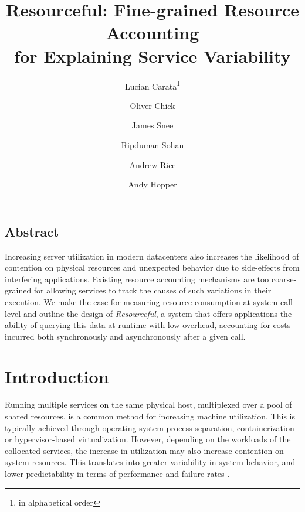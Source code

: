 \documentclass[letterpaper,twocolumn,10pt]{article}
\newcommand{\pname}{Resourceful}
\newcommand*\aorder[1][\value{footnote}]{\footnotemark[#1]}
\begin{document}
\date{}

\title{\Large \bf \pname: Fine-grained Resource Accounting\\for Explaining Service Variability}

\author{Lucian Carata\thanks{in alphabetical order}\aorder} \author{Oliver
Chick\aorder} \author{James Snee\aorder} \author{\authorcr{}Ripduman Sohan}
\author{Andrew Rice} \author{Andy Hopper} 

\maketitle

\thispagestyle{empty}


\subsection*{Abstract}
Increasing server utilization in modern datacenters also increases the
likelihood of contention on physical resources and unexpected behavior due to
side-effects from interfering applications. Existing resource accounting
mechanisms are too coarse-grained for allowing services to track the causes of
such variations in their execution. We make the case for measuring resource
consumption at system-call level and outline the design of \emph{Resourceful}, a
system that offers applications the ability of querying this data at runtime
with low overhead, accounting for costs incurred both synchronously and
asynchronously after a given call.

\section{Introduction} 
Running multiple services on the same physical host, multiplexed over a pool of
shared resources, is a common method for increasing machine utilization. This is
typically achieved through operating system process separation, containerization
or hypervisor-based virtualization. However, depending on the workloads
of the collocated services, the increase in utilization may also increase
contention on system resources. This translates into greater variability in
system behavior, and lower predictability in terms of performance and failure
rates \cite{dean2013}.
\end{document}
